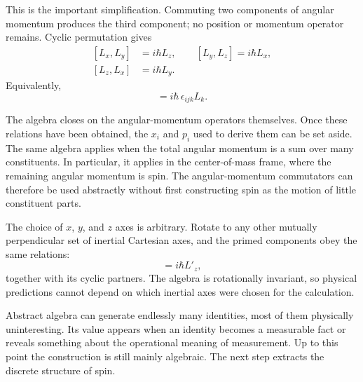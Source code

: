 This is the important simplification. Commuting two components of angular momentum produces the third component; no position or momentum operator remains. Cyclic permutation gives
\begin{equation}
\begin{aligned}
[L_x,L_y]&=i\hbar L_z,\qquad
[L_y,L_z]=i\hbar L_x,\\
[L_z,L_x]&=i\hbar L_y.
\end{aligned}
\end{equation}
Equivalently,
\begin{equation}
[L_i,L_j]=i\hbar\,\epsilon_{ijk}L_k.
\end{equation}

The algebra closes on the angular-momentum operators themselves. Once these relations have been obtained, the \(x_i\) and \(p_i\) used to derive them can be set aside. The same algebra applies when the total angular momentum is a sum over many constituents. In particular, it applies in the center-of-mass frame, where the remaining angular momentum is spin. The angular-momentum commutators can therefore be used abstractly without first constructing spin as the motion of little constituent parts.

The choice of \(x\), \(y\), and \(z\) axes is arbitrary. Rotate to any other mutually perpendicular set of inertial Cartesian axes, and the primed components obey the same relations:
\begin{equation}
[L'_x,L'_y]=i\hbar L'_z,
\end{equation}
together with its cyclic partners. The algebra is rotationally invariant, so physical predictions cannot depend on which inertial axes were chosen for the calculation.

\begin{classroomqa}
\end{classroomqa}

Abstract algebra can generate endlessly many identities, most of them physically uninteresting. Its value appears when an identity becomes a measurable fact or reveals something about the operational meaning of measurement. Up to this point the construction is still mainly algebraic. The next step extracts the discrete structure of spin.

